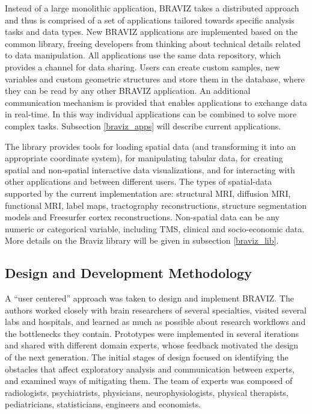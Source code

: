 \documentclass{frontiersHLTH}
\begin{document}
Instead of a large monolithic application, BRAVIZ takes a distributed approach and thus is comprised of a set of applications tailored towards specific analysis tasks and data types. 
New BRAVIZ applications are implemented based on the common library, freeing developers from thinking about technical details related to data manipulation. All applications use the same data repository, which provides a channel for data sharing. Users can create custom samples, new variables and custom geometric structures and store them in the database, where they can be read by any other BRAVIZ application. An additional communication mechanism is provided that enables applications to exchange data in real-time. In this way individual applications can be combined to solve more complex tasks. Subsection \ref{braviz_apps} will describe current applications.

The library provides tools for loading spatial data (and transforming it into an appropriate coordinate system), for manipulating tabular data, for creating spatial and non-spatial interactive data visualizations, and for interacting with other applications and between different users. The types of spatial-data supported by the current implementation are: structural MRI, diffusion MRI, functional MRI, label maps, tractography reconstructions, structure segmentation models and Freesurfer cortex reconstructions. Non-spatial data can be any numeric or categorical variable, including TMS, clinical and socio-economic data. More details on the Braviz library will be given in subsection \ref{braviz_lib}. 

\subsection{Design and Development Methodology}

A ``user centered'' approach \cite{wassink_applying_2009} was taken to design and implement BRAVIZ. The authors worked closely with brain researchers of several specialties, visited several labs and hospitals, and learned as much as possible about research workflows and the bottlenecks they contain. Prototypes were implemented in several iterations and shared with different domain experts, whose feedback motivated the design of the next generation.
The initial stages of design focused on identifying the obstacles that affect exploratory analysis and communication between experts, and examined ways of mitigating them. The team of experts was composed of radiologists, psychiatrists, physicians, neurophysiologists, physical therapists, pediatricians, statisticians, engineers and economists.
\end{document}
